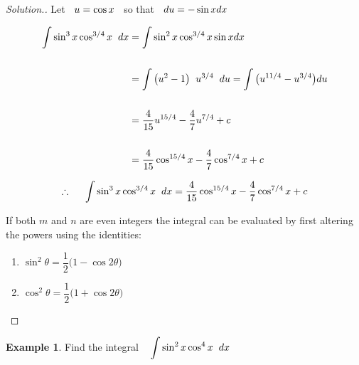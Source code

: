 \documentclass[11pt,a4paper]{article}
\theoremstyle{definition}
\newtheorem{exa}[thm]{Example}
\newenvironment{solution}
  {\renewcommand{\qedsymbol}{}\begin{proof}[\textit{Solution}.]}
  {\end{proof}}
\begin{document}
\begin{solution}
Let $\hspace{0.2cm} u = \cos x \hspace{0.2cm}$ so that $\hspace{0.2cm}  du = -\sin x dx$

\begin{align*}
\int \sin^3x\cos^{3/4}x\hspace{0.2cm}dx & = \int \sin^2x\cos^{3/4}x\sin x dx\\\\
& = \int \big(u^2 - 1\big)\hspace{0.2cm} u^{3/4}\hspace{0.2cm} du = \int \big(u^{11/4} - u^{3/4}\big)du\\\\
& = \frac{4}{15}u^{15/4} - \dfrac{4}{7}u^{7/4}  + c\\\\
& = \frac{4}{15}\cos^{15/4} x - \dfrac{4}{7}\cos^{7/4}x + c
\end{align*}

$$\therefore\hspace{0.5cm}\int \sin^3x\cos^{3/4}x\hspace{0.2cm}dx = \frac{4}{15}\cos^{15/4} x - \dfrac{4}{7}\cos^{7/4}x + c$$

If both $m$ and $n$ are even integers the integral can be evaluated by first altering the powers using the identities:
\begin{enumerate}
      \item[] $\sin^2\theta  = \dfrac{1}{2}\big(1 - \cos 2\theta\big)$

      \item[] $\cos^2\theta = \dfrac{1}{2}\big(1 + \cos 2\theta\big)$
\end{enumerate}
\end{solution}

\begin{exa}
Find the integral $\hspace{0.3cm} \displaystyle{\int\sin^2x\cos^4x\hspace{0.2cm}dx}$
\end{exa}
\end{document}
